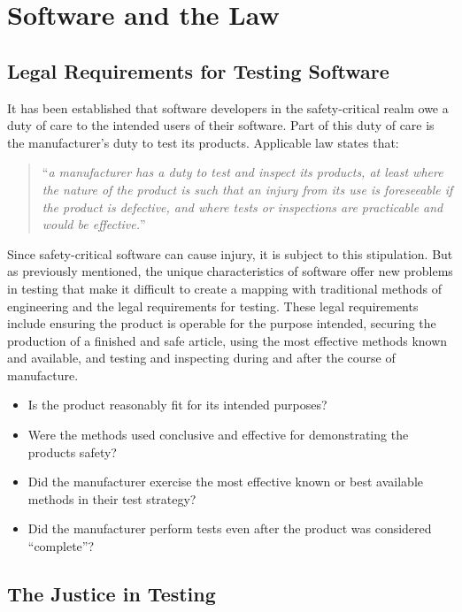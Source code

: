 \chapter{Software and the Law}

\section{Legal Requirements for Testing Software}

It has been established that software developers in the safety-critical realm
owe a duty of care to the intended users of their software. Part of this duty
of care is the manufacturer's duty to test its products. Applicable law states
that:

\begin{quote}
``\textit{a manufacturer has a duty to test and inspect its products, at least
where the nature of the product is such that an injury from its use is 
foreseeable if the product is defective, and where tests or inspections are 
practicable and would be effective.}'' \cite{Testing2005}
\end{quote}

Since safety-critical software can cause injury, it is subject to this
stipulation. But as previously mentioned, the unique characteristics of
software offer new problems in testing that make it difficult to create a
mapping with traditional methods of engineering and the legal requirements for
testing. These legal requirements include ensuring the product is operable for
the purpose intended, securing the production of a finished and safe article,
using the most effective methods known and available, and testing and
inspecting during and after the course of manufacture.
\singlespace
\begin{itemize}
  \item Is the product reasonably fit for its intended purposes?
  \item Were the methods used conclusive and effective for demonstrating the
  products safety?
  \item Did the manufacturer exercise the most effective known or best available
  methods in their test strategy?
  \item Did the manufacturer perform tests even after the product was considered
  ``complete''?
\end{itemize}
\doublespace

\section{The Justice in Testing}



